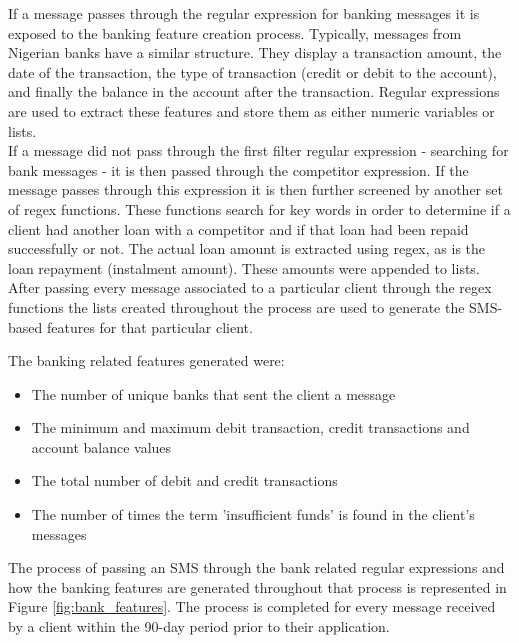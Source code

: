 If a message passes through the regular expression for banking messages it is exposed to the banking feature creation process. Typically, messages from Nigerian banks have a similar structure. They display a transaction amount, the date of the transaction, the type of transaction (credit or debit to the account), and finally the balance in the account after the transaction. Regular expressions are used to extract these features and store them as either numeric variables or lists.  \\

If a message did not pass through the first filter regular expression - searching for bank messages - it is then passed through the competitor expression. If the message passes through this expression it is then further screened by another set of regex functions. These functions search for key words in order to determine if a client had another loan with a competitor and if that loan had been repaid successfully or not. The actual loan amount is extracted using regex, as is the loan repayment (instalment amount). These amounts were appended to lists. \\

After passing every message associated to a particular client through the regex functions the lists created throughout the process are used to generate the SMS-based features for that particular client. \\

\vspace{10pt}

The banking related features generated were:

\begin{itemize}
    \item The number of unique banks that sent the client a message
    \item The minimum and maximum debit transaction, credit transactions and account balance values 
    \item The total number of debit and credit transactions 
    \item The number of times the term 'insufficient funds' is found in the client's messages
\end{itemize}

\vspace{10pt}

The process of passing an SMS through the bank related regular expressions and how the banking features are generated throughout that process is represented in Figure \ref{fig:bank_features}. The process is completed for every message received by a client within the 90-day period prior to their application. 

